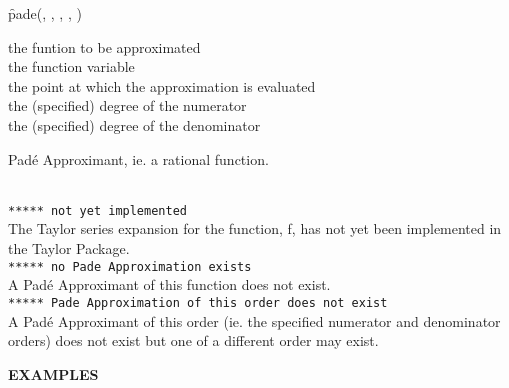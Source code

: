\hypertarget{operator:PADE}{}
\begin{description}[labelwidth=!,leftmargin=20mm]
\item[\textbf{SYNTAX:}]
  \begin{syntax}
    \f{pade(, , , , )}
  \end{syntax}

\item[\textbf{INPUT:}]
 \hspace{6mm} the funtion to be approximated\\
 \hspace{6mm} the function variable\\
 \hspace{6mm} the point at which the approximation is evaluated\\
 \hspace{6mm} the (specified) degree of the numerator\\
 \hspace{6mm} the (specified) degree of the denominator

\item[\textbf{RESULT:}]
Pad\'{e} Approximant, ie. a rational function.

\item[\textbf{ERROR MESSAGES:}]\mbox{}\\
%
 \hspace{6mm} \texttt{***** not yet implemented}\\
%
The Taylor series expansion for the function, f, has not yet
been implemented in the {\REDUCE} Taylor Package.\\[\baselineskip]
%
 \hspace{6mm} \texttt{***** no Pade Approximation exists}\\
%
A Pad\'{e} Approximant of this function does not exist.\\[\baselineskip]
%
 \hspace{6mm} \texttt{***** Pade Approximation of this order does not exist}\\
%
A Pad\'{e} Approximant of this order (ie. the specified
numerator and denominator orders) does not exist but one
of a different order may exist.\\[\baselineskip]
\end{description}

{\large\textbf{EXAMPLES}}

